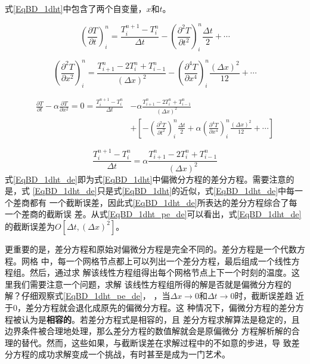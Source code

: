 式\eqref{EqBD_1dht}中包含了两个自变量，$x$和$t$。

\begin{equation}
  \left(
    \frac{\partial T}{\partial t}
  \right)_{i}^{n}
  =
  \frac{T_{i}^{n+1}-T_{i}^{n}}{\Delta t}
  -
  \left(
    \frac{\partial^{2} T}{\partial t^{2}}
  \right)_{i}^{n}
  \frac{\Delta t}{2}
  +
  \cdots
\end{equation}

\begin{equation}
  \left(
    \frac{\partial^{2} T}{\partial x^{2}}
  \right)_{i}^{n}
  =
  \frac{T_{i+1}^{n}-2T_{i}^{n}+T_{i-1}^{n}}{(\Delta x)^2}
  -
  \left(
    \frac{\partial^{4} T}{\partial x^{4}}
  \right)_{i}^{n}
  \frac{(\Delta x)^{2}}{12}
  +
  \cdots
\end{equation}

\begin{equation}
  \begin{aligned}
    \frac{\partial T}{\partial t}
    -
    \alpha
    \frac{\partial T}{\partial x^{2}}
    =
    0
    =
    \frac{T_{i}^{n+1}-T_{i}^{n}}{\Delta t}
    &-
    \alpha\frac{T_{i+1}^{n}-2T_{i}^{n}+T_{i-1}^{n}}{(\Delta x)^2}
    \\
    &+
    \left[
      -
      \left(
        \frac{\partial^{2} T}{\partial t^{2}}
      \right)_{i}^{n}
      \frac{\Delta t}{2}
      +
      \alpha
      \left(
        \frac{\partial^{4} T}{\partial x^{4}}
      \right)_{i}^{n}
      \frac{(\Delta x)^{2}}{12}
      +
      \cdots
    \right]
  \end{aligned}
  \label{EqBD_1dht_pe_de}
\end{equation}

\begin{equation}
    \frac{T_{i}^{n+1}-T_{i}^{n}}{\Delta t}
    =
    \alpha\frac{T_{i+1}^{n}-2T_{i}^{n}+T_{i-1}^{n}}{(\Delta x)^2}
    \label{EqBD_1dht_de}
\end{equation}
式\eqref{EqBD_1dht_de}即为式\eqref{EqBD_1dht}中偏微分方程的差分方程。需要注意的是，式
\eqref{EqBD_1dht_de}只是式\eqref{EqBD_1dht}的近似，式\eqref{EqBD_1dht_de}中每一个差商都有
一个截断误差，因此式\eqref{EqBD_1dht_de}所表达的差分方程综合了每一个差商的截断误
差。从式\eqref{EqBD_1dht_pe_de}可以看出，式\eqref{EqBD_1dht_de}的截断误差为$O[\Delta t, (\Delta
x)^{2}]$。

更重要的是，差分方程和原始对偏微分方程是完全不同的。差分方程是一个代数方程。网格
中，每一个网格节点都上可以列出一个差分方程，最后组成一个线性方程组。然后，通过求
解该线性方程组得出每个网格节点上下一个时刻的温度。这里我们需要注意一个问题，求解
该线性方程组所得的解是否就是偏微分方程的解？仔细观察式\eqref{EqBD_1dht_pe_de}，
，当$\Delta x \rightarrow 0$和$\Delta t \rightarrow 0$时，截断误差趋
近于0，差分方程就会退化成原先的偏微分方程。这
种情况下，偏微分方程的差分方程被认为是\textbf{相容的}。若差分方程式是相容的，且
差分方程求解算法是稳定的，且边界条件被合理地处理，那么差分方程的数值解就会是原偏微分
方程解析解的合理的替代。然而，这些如果，与截断误差在求解过程中的不如意的步进，导
致差分方程的成功求解变成一个挑战，有时甚至是成为一门艺术。


